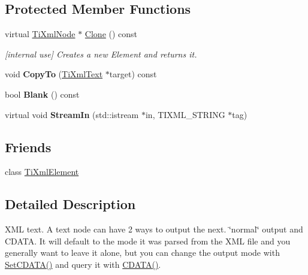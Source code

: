 \subsection*{Protected Member Functions}
\begin{DoxyCompactItemize}
\item 
\hypertarget{class_ti_xml_text_a0c411e93a27537369479d034cc82da3b}{
virtual \hyperlink{class_ti_xml_node}{TiXmlNode} $\ast$ \hyperlink{class_ti_xml_text_a0c411e93a27537369479d034cc82da3b}{Clone} () const }
\label{class_ti_xml_text_a0c411e93a27537369479d034cc82da3b}

\begin{DoxyCompactList}\small\item\em \mbox{[}internal use\mbox{]} Creates a new Element and returns it. \item\end{DoxyCompactList}\item 
\hypertarget{class_ti_xml_text_adcec7d9b6fccfc5777452bb97e6031c1}{
void {\bfseries CopyTo} (\hyperlink{class_ti_xml_text}{TiXmlText} $\ast$target) const }
\label{class_ti_xml_text_adcec7d9b6fccfc5777452bb97e6031c1}

\item 
\hypertarget{class_ti_xml_text_a1c120428e3b3cf24d79706e6d2b65aa6}{
bool {\bfseries Blank} () const }
\label{class_ti_xml_text_a1c120428e3b3cf24d79706e6d2b65aa6}

\item 
\hypertarget{class_ti_xml_text_ab0ad9f14fd41689ced26f21a5c8919b4}{
virtual void {\bfseries StreamIn} (std::istream $\ast$in, TIXML\_\-STRING $\ast$tag)}
\label{class_ti_xml_text_ab0ad9f14fd41689ced26f21a5c8919b4}

\end{DoxyCompactItemize}
\subsection*{Friends}
\begin{DoxyCompactItemize}
\item 
\hypertarget{class_ti_xml_text_ab6592e32cb9132be517cc12a70564c4b}{
class \hyperlink{class_ti_xml_text_ab6592e32cb9132be517cc12a70564c4b}{TiXmlElement}}
\label{class_ti_xml_text_ab6592e32cb9132be517cc12a70564c4b}

\end{DoxyCompactItemize}


\subsection{Detailed Description}
XML text. A text node can have 2 ways to output the next. \char`\"{}normal\char`\"{} output and CDATA. It will default to the mode it was parsed from the XML file and you generally want to leave it alone, but you can change the output mode with \hyperlink{class_ti_xml_text_acb17ff7c5d09b2c839393445a3de5ea9}{SetCDATA()} and query it with \hyperlink{class_ti_xml_text_ad1a6a6b83fa2271022dd97c072a2b586}{CDATA()}. 


